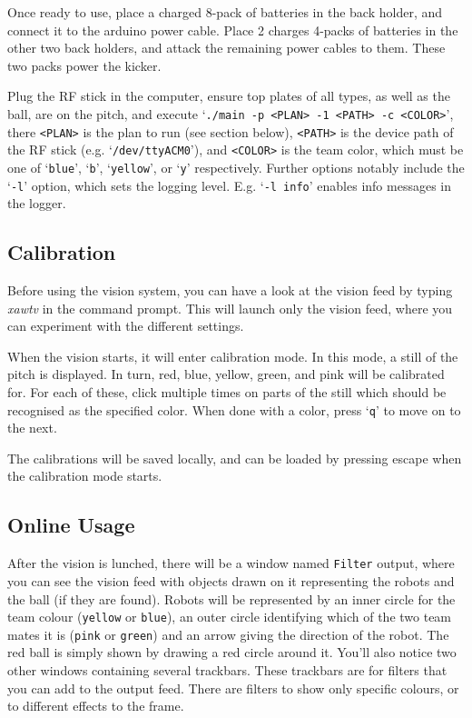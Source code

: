 \documentclass[a4paper]{scrartcl}
\begin{document}
Once ready to use, place a charged 8-pack of batteries in the back holder, and
connect it to the arduino power cable. Place 2 charges 4-packs of batteries in
the other two back holders, and attack the remaining power cables to them.
These two packs power the kicker.

Plug the RF stick in the computer, ensure top plates of all types, as well as
the ball, are on the pitch, and execute
`\texttt{./main -p <PLAN> -1 <PATH> -c <COLOR>}', there \texttt{<PLAN>} is the
plan to run (see section below), \texttt{<PATH>} is the device path of the RF
stick (e.g. `\verb$/dev/ttyACM0$'), and \texttt{<COLOR>} is the team color,
which must be one of `\texttt{blue}', `\texttt{b}', `\texttt{yellow}', or
`\texttt{y}' respectively. Further options notably include the `\texttt{-l}'
option, which sets the logging level. E.g. `\texttt{-l info}' enables info
messages in the logger.

\subsection{Calibration}

Before using the vision system, you can have a look at the vision feed by typing \emph{xawtv} in the command prompt. This will launch only the vision feed, where you can experiment with the different settings.

When the vision starts, it will enter calibration mode. In this mode, a still
of the pitch is displayed. In turn, red, blue, yellow, green, and pink will be
calibrated for. For each of these, click multiple times on parts of the still
which should be recognised as the specified color. When done with a color,
press `\texttt{q}' to move on to the next.

The calibrations will be saved locally, and can be loaded by pressing escape
when the calibration mode starts.

\subsection{Online Usage}

After the vision is lunched, there will be a window named \texttt{Filter} output, where you can see the vision feed with objects drawn on it representing the robots and the ball (if they are found).
Robots will be represented by an inner circle for the team colour (\texttt{yellow} or \texttt{blue}), an outer circle identifying which of the two team mates it is (\texttt{pink} or \texttt{green}) and an arrow giving the direction of the robot. The red ball is simply shown by drawing a red circle around it. You'll also notice two other windows containing several trackbars.
These trackbars are for filters that you can add to the output feed. There are filters to show only specific colours, or to different effects to the frame.
\end{document}
